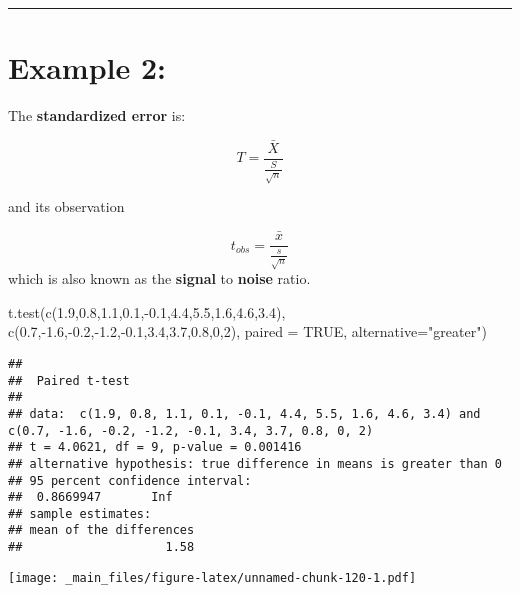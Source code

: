 \documentclass[
]{book}
\newenvironment{Shaded}{\begin{snugshade}}{\end{snugshade}}
\newcommand{\AttributeTok}[1]{\textcolor[rgb]{0.77,0.63,0.00}{#1}}
\newcommand{\ConstantTok}[1]{\textcolor[rgb]{0.00,0.00,0.00}{#1}}
\newcommand{\DecValTok}[1]{\textcolor[rgb]{0.00,0.00,0.81}{#1}}
\newcommand{\FloatTok}[1]{\textcolor[rgb]{0.00,0.00,0.81}{#1}}
\newcommand{\FunctionTok}[1]{\textcolor[rgb]{0.00,0.00,0.00}{#1}}
\newcommand{\NormalTok}[1]{#1}
\newcommand{\SpecialCharTok}[1]{\textcolor[rgb]{0.00,0.00,0.00}{#1}}
\newcommand{\StringTok}[1]{\textcolor[rgb]{0.31,0.60,0.02}{#1}}
\begin{document}
\begin{center}\rule{0.5\linewidth}{0.5pt}\end{center}

\hypertarget{example-2-5}{%
\section{Example 2:}\label{example-2-5}}

The \textbf{standardized error} is:

\[T=\frac{\bar{X}}{\frac{S}{\sqrt{n}}}\]

and its observation

\[t_{obs}=\frac{\bar{x}}{\frac{s}{\sqrt{n}}}\]
which is also known as the \textbf{signal} to \textbf{noise} ratio.

\begin{Shaded}
\begin{Highlighting}[]
\FunctionTok{t.test}\NormalTok{(}\FunctionTok{c}\NormalTok{(}\FloatTok{1.9}\NormalTok{,}\FloatTok{0.8}\NormalTok{,}\FloatTok{1.1}\NormalTok{,}\FloatTok{0.1}\NormalTok{,}\SpecialCharTok{{-}}\FloatTok{0.1}\NormalTok{,}\FloatTok{4.4}\NormalTok{,}\FloatTok{5.5}\NormalTok{,}\FloatTok{1.6}\NormalTok{,}\FloatTok{4.6}\NormalTok{,}\FloatTok{3.4}\NormalTok{),}
       \FunctionTok{c}\NormalTok{(}\FloatTok{0.7}\NormalTok{,}\SpecialCharTok{{-}}\FloatTok{1.6}\NormalTok{,}\SpecialCharTok{{-}}\FloatTok{0.2}\NormalTok{,}\SpecialCharTok{{-}}\FloatTok{1.2}\NormalTok{,}\SpecialCharTok{{-}}\FloatTok{0.1}\NormalTok{,}\FloatTok{3.4}\NormalTok{,}\FloatTok{3.7}\NormalTok{,}\FloatTok{0.8}\NormalTok{,}\DecValTok{0}\NormalTok{,}\DecValTok{2}\NormalTok{),}
       \AttributeTok{paired =} \ConstantTok{TRUE}\NormalTok{,}
       \AttributeTok{alternative=}\StringTok{"greater"}\NormalTok{)}
\end{Highlighting}
\end{Shaded}

\begin{verbatim}
## 
##  Paired t-test
## 
## data:  c(1.9, 0.8, 1.1, 0.1, -0.1, 4.4, 5.5, 1.6, 4.6, 3.4) and c(0.7, -1.6, -0.2, -1.2, -0.1, 3.4, 3.7, 0.8, 0, 2)
## t = 4.0621, df = 9, p-value = 0.001416
## alternative hypothesis: true difference in means is greater than 0
## 95 percent confidence interval:
##  0.8669947       Inf
## sample estimates:
## mean of the differences 
##                    1.58
\end{verbatim}

\texttt{[image: \_main\_files/figure-latex/unnamed-chunk-120-1.pdf]}
\end{document}
